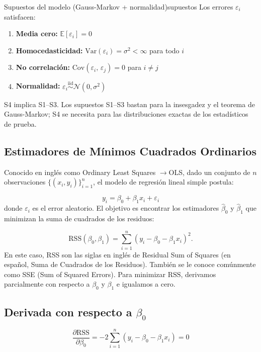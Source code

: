\documentclass[12pt, a4paper]{article}
\newcommand{\E}[1]{\mathbb{E}\!\left[#1\right]}
\newcommand{\Var}[1]{\mathrm{Var}\!\left(#1\right)}
\newcommand{\Cov}[2]{\mathrm{Cov}\!\left(#1,\,#2\right)}
\begin{document}
\begin{definicion}{Supuestos del modelo (Gauss-Markov + normalidad)}{supuestos}
Los errores $\varepsilon_i$ satisfacen:
\begin{enumerate}[label=\textbf{S\arabic*.}, leftmargin=2.5cm]
  \item \textbf{Media cero:} $\E{\varepsilon_i} = 0$
  \item \textbf{Homocedasticidad:} $\Var{\varepsilon_i} = \sigma^2 < \infty$
        \quad para todo $i$
  \item \textbf{No correlación:} $\Cov{\varepsilon_i}{\varepsilon_j} = 0$
        para $i \neq j$
  \item \textbf{Normalidad:}
        $\varepsilon_i \overset{\text{iid}}{\sim} \mathcal{N}(0,\sigma^2)$
\end{enumerate}
S4 implica S1--S3. Los supuestos S1--S3 bastan para la insesgadez y el
teorema de Gauss-Markov; S4 se necesita para las distribuciones exactas de
los estadísticos de prueba.
\end{definicion}

\bigskip

\subsection{Estimadores de Mínimos Cuadrados Ordinarios }

Conocido en inglés como Ordinary Least Squares $\to $OLS, dado un conjunto de $n$ observaciones $\{(x_i, y_i)\}_{i=1}^n$, el modelo de regresión lineal simple postula:

\[
y_i = \beta_0 + \beta_1 x_i + \varepsilon_i
\]
%
donde $\varepsilon_i$ es el error aleatorio. El objetivo es encontrar los estimadores $\hat{\beta}_0$ y $\hat{\beta}_1$ que minimizan la suma de cuadrados de los residuos:

\[
\text{RSS}(\beta_0, \beta_1) = \sum_{i=1}^n (y_i - \beta_0 - \beta_1 x_i)^2.
\]
En este caso, RSS son las siglas en inglés de Residual Sum of Squares (en español, Suma de Cuadrados de los Residuos). También se le conoce comúnmente como SSE (Sum of Squared Errors).
Para minimizar $\text{RSS}$, derivamos parcialmente con respecto a $\beta_0$ y $\beta_1$ e igualamos a cero.

\subsection*{Derivada con respecto a $\beta_0$}

\[
\frac{\partial \text{RSS}}{\partial \beta_0} = -2 \sum_{i=1}^n (y_i - \beta_0 - \beta_1 x_i) = 0
\]
\end{document}
